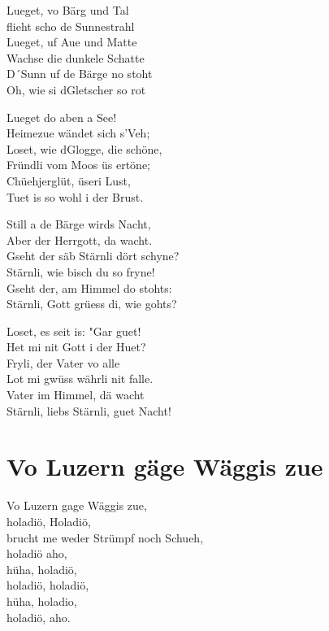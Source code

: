 \documentclass[
  letterpaper,
  twoside=false]{scrbook}
\begin{document}
Lueget, vo Bärg und Tal\\
flieht scho de Sunnestrahl\\
Lueget, uf Aue und Matte\\
Wachse die dunkele Schatte\\
D´Sunn uf de Bärge no stoht\\
Oh, wie si d\textquotesingle Gletscher so rot

Lueget do aben a See!\\
Heimezue wändet sich s'Veh;\\
Loset, wie d\textquotesingle Glogge, die schöne,\\
Fründli vom Moos üs ertöne;\\
Chüehjerglüt, üseri Lust,\\
Tuet is so wohl i der Brust.

Still a de Bärge wird\textquotesingle s Nacht,\\
Aber der Herrgott, da wacht.\\
Gseht der säb Stärnli dört schyne?\\
Stärnli, wie bisch du so fryne!\\
Gseht der, am Himmel do stoht\textquotesingle s:\\
Stärnli, Gott grüess di, wie goht\textquotesingle s?

Loset, es seit is: "Gar guet!\\
Het mi nit Gott i der Huet?\\
Fryli, der Vater vo alle\\
Lot mi gwüss währli nit falle.\\
Vater im Himmel, dä wacht\\
Stärnli, liebs Stärnli, guet Nacht!

\hypertarget{vo-luzern-guxe4ge-wuxe4ggis-zue}{%
\chapter{Vo Luzern gäge Wäggis
zue}\label{vo-luzern-guxe4ge-wuxe4ggis-zue}}

Vo Luzern gage Wäggis zue,\\
holadiö, Holadiö,\\
brucht me weder Strümpf noch Schueh,\\
holadiö aho,\\
hüha, holadiö,\\
holadiö, holadiö,\\
hüha, holadio,\\
holadiö, aho.
\end{document}
